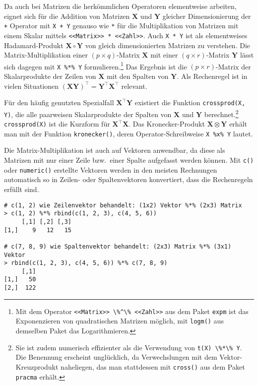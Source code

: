 Da auch bei Matrizen die herkömmlichen Operatoren elementweise arbeiten, eignet sich für die Addition von Matrizen $\bm{X}$ und $\bm{Y}$ gleicher Dimensionierung der \lstinline!+! Operator mit \lstinline!X + Y! genauso wie \lstinline!*! für die Multiplikation von Matrizen mit einem Skalar mittels \lstinline!<<Matrix>> * <<Zahl>>!. Auch \lstinline!X * Y! ist als elementweises Hadamard-Produkt $\bm{X} \circ \bm{Y}$ von gleich dimensionierten Matrizen zu verstehen. Die Matrix-Multiplikation einer $(p \times q)$-Matrix $\bm{X}$ mit einer $(q \times r)$-Matrix $\bm{Y}$ lässt sich dagegen mit \lstinline!X %*% Y! formulieren.\footnote{Mit dem Operator \lstinline!<<Matrix>> \%^\% <<Zahl>>! aus dem Paket \lstinline!expm! \cite{Goulet2010} ist das Exponenzieren von quadratischen Matrizen möglich, mit \lstinline!logm()! aus demselben Paket das Logarithmieren.} Das Ergebnis ist die $(p \times r)$-Matrix der Skalarprodukte der Zeilen von $\bm{X}$ mit den Spalten von $\bm{Y}$. Als Rechenregel ist in vielen Situationen $(\bm{X} \bm{Y})^{\top} = \bm{Y}^{\top} \bm{X}^{\top}$ relevant.

Für den häufig genutzten Spezialfall $\bm{X}^{\top} \bm{Y}$ existiert die Funktion \lstinline!crossprod(X, Y)!, die alle paarweisen Skalarprodukte der Spalten von $\bm{X}$ und $\bm{Y}$ berechnet.\footnote{Sie ist zudem numerisch effizienter als die Verwendung von \lstinline!t(X) \%*\% Y!. Die Benennung erscheint unglücklich, da Verwechslungen mit dem Vektor-Kreuzprodukt naheliegen, das man stattdessen mit \lstinline!cross()! aus dem Paket \lstinline!pracma! \cite{Borchers2011} erhält.} \lstinline!crossprod(X)! ist die Kurzform für $\bm{X}^{\top} \bm{X}$. Das Kronecker-Produkt $\bm{X} \otimes \bm{Y}$ erhält man mit der Funktion \lstinline!kronecker()!, deren Operator-Schreibweise \lstinline!X %x% Y! lautet.

Die Matrix-Multiplikation ist auch auf Vektoren anwendbar, da diese als Matrizen mit nur einer Zeile bzw.\ einer Spalte aufgefasst werden können. Mit \lstinline!c()! oder \lstinline!numeric()! erstellte Vektoren werden in den meisten Rechnungen automatisch so in Zeilen- oder Spaltenvektoren konvertiert, dass die Rechenregeln erfüllt sind.
\begin{lstlisting}
# c(1, 2) wie Zeilenvektor behandelt: (1x2) Vektor %*% (2x3) Matrix
> c(1, 2) %*% rbind(c(1, 2, 3), c(4, 5, 6))
     [,1] [,2] [,3]
[1,]    9   12   15

# c(7, 8, 9) wie Spaltenvektor behandelt: (2x3) Matrix %*% (3x1) Vektor
> rbind(c(1, 2, 3), c(4, 5, 6)) %*% c(7, 8, 9)
     [,1]
[1,]   50
[2,]  122
\end{lstlisting}

